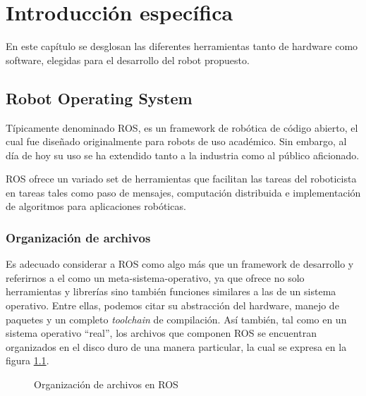 \chapter{Introducción específica}

\label{Capitulo2}

En este capítulo se desglosan las diferentes herramientas tanto de hardware como software, elegidas para el desarrollo del robot propuesto.

\section{Robot Operating System}

Típicamente denominado ROS, es un framework de robótica de código abierto, el cual fue diseñado originalmente para robots de uso académico. Sin embargo, al día de hoy su uso se ha extendido tanto a la industria como al público aficionado.

ROS ofrece un variado set de herramientas que facilitan las tareas del roboticista en tareas tales como paso de mensajes, computación distribuida e implementación de algoritmos para aplicaciones robóticas.

\subsection{Organización de archivos}\label{sec:organizacionArchivos}

Es adecuado considerar a ROS como algo más que un framework de desarrollo y referirnos a el como un meta-sistema-operativo, ya que ofrece no solo herramientas y librerías sino también funciones similares a las de un sistema operativo. Entre ellas, podemos citar su abstracción del hardware, manejo de paquetes y un completo \textit{toolchain} de compilación. Así también, tal como en un sistema operativo ``real'', los archivos que componen ROS se encuentran organizados en el disco duro de una manera particular, la cual se expresa en la figura \ref{fig:rosSistemaDeArchivos}.

\begin{figure}[ht]
    \centering
    \def\svgwidth{350pt}
    
    \caption{Organización de archivos en ROS}
    \label{fig:rosSistemaDeArchivos}
\end{figure}

